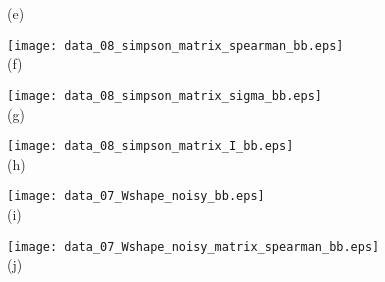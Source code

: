 \documentclass[journal]{vgtc}                %
\begin{document}
\begin{figure*}[ht!]
\begin{minipage}{0.25\textwidth}
   \hspace{0.27cm}  \footnotesize (e) 
  \end{minipage}
  \hfill
  \begin{minipage}{0.23\textwidth}
   \centering

     \texttt{[image: data\_08\_simpson\_matrix\_spearman\_bb.eps]}\\

   \hspace{-0.13cm} \footnotesize (f) 
  \end{minipage}
  \hfill
  \begin{minipage}{0.23\textwidth}
   \centering

     \texttt{[image: data\_08\_simpson\_matrix\_sigma\_bb.eps]}\\

   \hspace{-0.25cm} \footnotesize (g) 
  \end{minipage}
  \hfill
  \begin{minipage}{0.23\textwidth}
   \centering

     \texttt{[image: data\_08\_simpson\_matrix\_I\_bb.eps]}\\

   \hspace{-0.32cm} \footnotesize (h) 
  \end{minipage} 
  
    \mbox{} \medskip
 
  \begin{minipage}{0.25\textwidth}
   \centering

     \hspace{-0.3cm} \texttt{[image: data\_07\_Wshape\_noisy\_bb.eps]}\\

   \hspace{0.27cm}  \footnotesize (i) 
  \end{minipage}
  \hfill
  \begin{minipage}{0.23\textwidth}
   \centering

     \texttt{[image: data\_07\_Wshape\_noisy\_matrix\_spearman\_bb.eps]}\\

   \hspace{-0.13cm} \footnotesize (j) 
  \end{minipage}
  \hfill
  \begin{minipage}{0.23\textwidth}
   \centering


\end{minipage}
\end{figure*}
\end{document}
